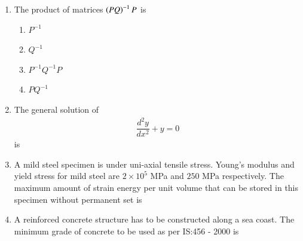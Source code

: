 \documentclass[journal]{IEEEtran}
\begin{document}
\begin{enumerate}
\item The product of matrices $\left(PQ\right)^{-1} P$ is \hfill {}
\begin{enumerate}
\item $P^{-1}$
\item $Q^{-1}$
\item $P^{-1}Q^{-1}P$
\item $PQ^{-1}$
\end{enumerate}


\item The general solution of 
\begin{align} 
\dfrac{d^2y}{dx^2} + y = 0
\end{align}
is  \hfill {}
\begin{enumerate}
\end{enumerate}


\item A mild steel specimen is under uni-axial tensile stress. Young's modulus and yield stress for mild steel are $2 \times 10^5$ MPa and $250$ MPa respectively. The maximum amount of strain energy per unit volume that can be stored in this specimen without permanent set is \hfill {}

\begin{enumerate}
\end{enumerate}

\item A reinforced concrete structure has to be constructed along a sea coast. The minimum grade of concrete to be used as per IS:456 - 2000 is  \hfill {}
\begin{enumerate}
\end{enumerate}


\end{enumerate}
\end{document}
